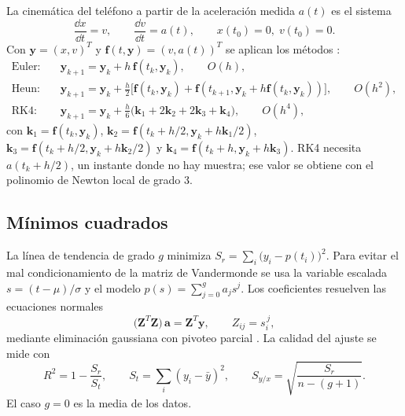 La cinemática del teléfono a partir de la aceleración medida $a(t)$ es el sistema
\begin{equation}
  \frac{\dd x}{\dd t} = v, \qquad \frac{\dd v}{\dd t} = a(t), \qquad x(t_0) = 0,\; v(t_0) = 0 .
  \label{eq:edo}
\end{equation}
Con $\mathbf{y} = (x, v)^T$ y $\mathbf{f}(t,\mathbf{y}) = (v, a(t))^T$ se aplican los métodos \parencite{chapra2015,burden2017}:
\begin{align}
  \text{Euler:}\quad & \mathbf{y}_{k+1} = \mathbf{y}_k + h\,\mathbf{f}(t_k,\mathbf{y}_k), \qquad O(h), \\
  \text{Heun:}\quad & \mathbf{y}_{k+1} = \mathbf{y}_k + \tfrac{h}{2}\bigl[\mathbf{f}(t_k,\mathbf{y}_k) + \mathbf{f}(t_{k+1},\mathbf{y}_k + h\mathbf{f}(t_k,\mathbf{y}_k))\bigr], \qquad O(h^2), \\
  \text{RK4:}\quad & \mathbf{y}_{k+1} = \mathbf{y}_k + \tfrac{h}{6}\bigl(\mathbf{k}_1 + 2\mathbf{k}_2 + 2\mathbf{k}_3 + \mathbf{k}_4\bigr), \qquad O(h^4),
\end{align}
con $\mathbf{k}_1 = \mathbf{f}(t_k,\mathbf{y}_k)$, $\mathbf{k}_2 = \mathbf{f}(t_k + h/2, \mathbf{y}_k + h\mathbf{k}_1/2)$, $\mathbf{k}_3 = \mathbf{f}(t_k + h/2, \mathbf{y}_k + h\mathbf{k}_2/2)$ y $\mathbf{k}_4 = \mathbf{f}(t_k + h, \mathbf{y}_k + h\mathbf{k}_3)$. RK4 necesita $a(t_k + h/2)$, un instante donde no hay muestra; ese valor se obtiene con el polinomio de Newton local de grado 3.

\subsection{Mínimos cuadrados}

La línea de tendencia de grado $g$ minimiza $S_r = \sum_i \bigl(y_i - p(t_i)\bigr)^2$. Para evitar el mal condicionamiento de la matriz de Vandermonde se usa la variable escalada $s = (t - \mu)/\sigma$ y el modelo $p(s) = \sum_{j=0}^{g} a_j s^j$. Los coeficientes resuelven las ecuaciones normales
\begin{equation}
  \bigl(\mathbf{Z}^T\mathbf{Z}\bigr)\,\mathbf{a} = \mathbf{Z}^T\mathbf{y}, \qquad Z_{ij} = s_i^{\,j},
  \label{eq:normales}
\end{equation}
mediante eliminación gaussiana con pivoteo parcial \parencite{chapra2015}. La calidad del ajuste se mide con
\begin{equation}
  R^2 = 1 - \frac{S_r}{S_t}, \qquad S_t = \sum_i (y_i - \bar y)^2, \qquad
  S_{y/x} = \sqrt{\frac{S_r}{n - (g+1)}} .
\end{equation}
El caso $g = 0$ es la media de los datos.


